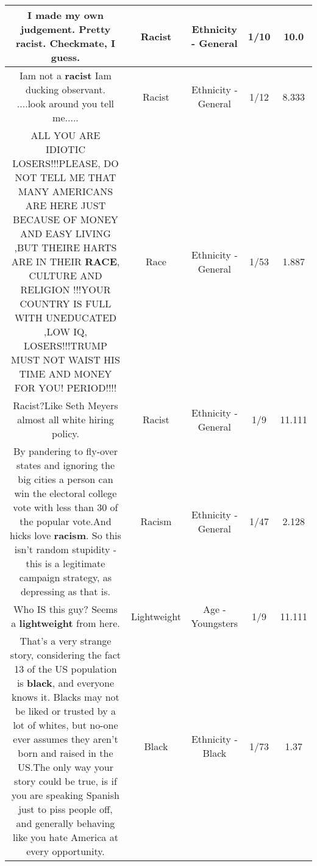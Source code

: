 \documentclass[11pt]{article}
\newlength\mylength
\begin{document}
\begin{center}
\begin{longtable}{|C{.65\mylength}|C{.30\mylength}|C{.12\mylength}|C{.12\mylength}|C{.12\mylength}|}
  \small I made my own judgement. Pretty \textbf{racist}. Checkmate, I guess.\normalsize   & Racist & Ethnicity - General & 1/10 & 10.0 \\  \hline
  \small Iam not a \textbf{racist} Iam ducking observant. ....look around you tell me.....\normalsize   & Racist & Ethnicity - General & 1/12 & 8.333 \\  \hline
  \small ALL YOU ARE IDIOTIC LOSERS!!!PLEASE, DO NOT TELL ME THAT MANY AMERICANS ARE HERE JUST BECAUSE OF MONEY AND EASY LIVING ,BUT THEIRE HARTS ARE IN THEIR \textbf{RACE}, CULTURE AND RELIGION !!!YOUR COUNTRY IS FULL WITH UNEDUCATED ,LOW IQ, LOSERS!!!TRUMP MUST NOT WAIST HIS TIME AND MONEY FOR YOU! PERIOD!!!!\normalsize   & Race & Ethnicity - General & 1/53 & 1.887 \\  \hline
  \small Racist?Like Seth Meyers almost all white hiring policy.\normalsize   & Racist & Ethnicity - General & 1/9 & 11.111 \\  \hline
  \small By pandering to fly-over states and ignoring the big  cities a person can win the electoral college vote with less than 30 of the popular vote.And hicks love \textbf{racism}.  So this isn't random stupidity - this is a legitimate campaign strategy, as depressing as that is.\normalsize   & Racism & Ethnicity - General & 1/47 & 2.128 \\  \hline
  \small Who IS this guy? Seems a \textbf{lightweight} from here.\normalsize   & Lightweight & Age - Youngsters & 1/9 & 11.111 \\  \hline
  \small That's a very strange story, considering the fact 13  of the US population is \textbf{black}, and everyone knows it. Blacks may not be liked or trusted by a lot of whites, but no-one ever assumes they aren't born and raised in the US.The only way your story could be true, is if you are speaking Spanish just to piss people off, and generally behaving like you hate America at every opportunity.\normalsize   & Black & Ethnicity - Black & 1/73 & 1.37 \\  \hline

\end{longtable}
\end{center}
\end{document}
